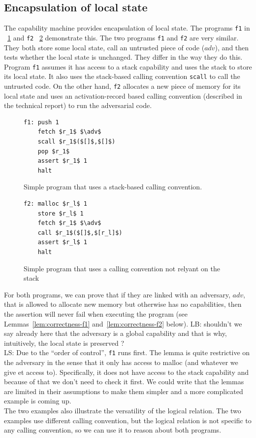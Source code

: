 \documentclass[compsoc,conference,letterpaper,fleqn]{IEEEtran}
\newcommand\lau[1]{{\color{purple} \sf \footnotesize {LS: #1}}\\}
\newcommand\lars[1]{{\color{purple} \sf \footnotesize {LB: #1}}\\}
\newcommand{\var}[1]{\mathit{#1}}
\newcommand{\adv}{\var{adv}}
\begin{document}
\subsection{Encapsulation of local state}
The capability machine provides encapsulation of local state. The
programs \texttt{f1} in \figurename~\ref{fig:prog-f1} and \texttt{f2}
\figurename~\ref{fig:prog-f2} demonstrate this.  The two programs
\texttt{f1} and \texttt{f2} are very similar. They both store some
local state, call an untrusted piece of code ($\adv$), and then tests
whether the local state is unchanged. They differ in the way they do
this. Program \texttt{f1} assumes it has access to a stack capability
and uses the stack to store its local state. It also uses the
stack-based calling convention \texttt{scall} to call the untrusted code. On the
other hand, \texttt{f2} allocates a new piece of memory for its local
state and uses an activation-record based calling convention
(described in the technical report) to run the adversarial code.

\begin{figure}[htbp]
  \centering
  \begin{lstlisting}
f1: push 1
    fetch $r_1$ $\adv$
    scall $r_1$($[]$,$[]$)
    pop $r_1$
    assert $r_1$ 1
    halt
\end{lstlisting}
  \caption{Simple program that uses a stack-based calling convention.}
  \label{fig:prog-f1}
\end{figure}

\begin{figure}[htbp]
  \centering
\begin{lstlisting}
f2: malloc $r_l$ 1
    store $r_l$ 1
    fetch $r_1$ $\adv$
    call $r_1$($[]$,$[r_l]$)
    assert $r_l$ 1
    halt
\end{lstlisting}
  \caption{Simple program that uses a calling convention not relyant
    on the stack}
  \label{fig:prog-f2}
\end{figure}

For both programs, we can prove that if they are linked with an
adversary, $\adv$, that is allowed to allocate new memory but
otherwise has no capabilities, then the assertion will never fail when
executing the program (see Lemmas~\ref{lem:correctness-f1}
and~\ref{lem:correctness-f2} below).  \lars{shouldn't we say already
here that the adversary is a global capability and that is why,
intuitively, the local state is preserved ?} \lau{Due to the ``order
of control'', \texttt{f1} runs first. The lemma is quite restrictive
on the adversary in the sense that it only has access to malloc (and
whatever we give et access to). Specifically, it does not have access
to the stack capability and because of that we don't need to check it
first. We could write that the lemmas are limited in their assumptions
to make them simpler and a more complicated example is coming up.}
The two examples also illustrate the versatility of the logical
relation. The two examples use different calling convention, but the
logical relation is not specific to any calling convention, so we can
use it to reason about both programs.
\end{document}
